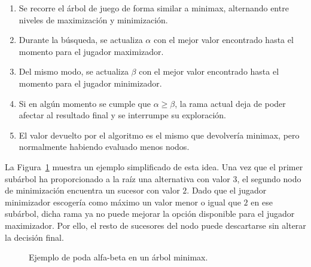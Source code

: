 \begin{enumerate}
    \item Se recorre el árbol de juego de forma similar a minimax, alternando entre niveles de maximización y minimización.
    \item Durante la búsqueda, se actualiza $\alpha$ con el mejor valor encontrado hasta el momento para el jugador maximizador.
    \item Del mismo modo, se actualiza $\beta$ con el mejor valor encontrado hasta el momento para el jugador minimizador.
    \item Si en algún momento se cumple que $\alpha \geq \beta$, la rama actual deja de poder afectar al resultado final y se interrumpe su exploración.
    \item El valor devuelto por el algoritmo es el mismo que devolvería minimax, pero normalmente habiendo evaluado menos nodos.
\end{enumerate}

La Figura~\ref{fig:alphabeta-pruning} muestra un ejemplo simplificado de esta idea. Una vez que el primer subárbol ha proporcionado a la raíz una alternativa con valor $3$, el segundo nodo de minimización encuentra un sucesor con valor $2$. Dado que el jugador minimizador escogería como máximo un valor menor o igual que $2$ en ese subárbol, dicha rama ya no puede mejorar la opción disponible para el jugador maximizador. Por ello, el resto de sucesores del nodo puede descartarse sin alterar la decisión final.

\vspace{0.5cm}
\begin{figure}[H]
\centering
{}
\caption{Ejemplo de poda alfa-beta en un árbol minimax.}
\label{fig:alphabeta-pruning}
\end{figure}
\vspace{0.8cm}

